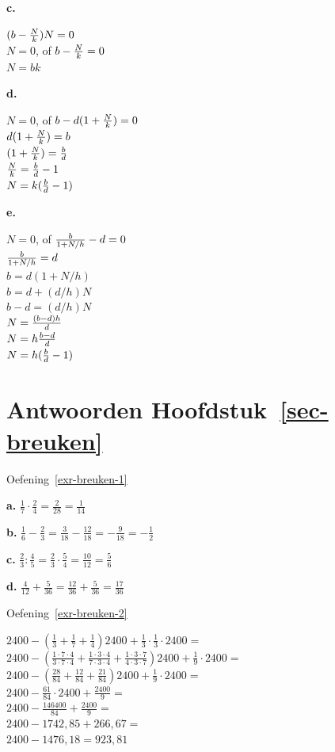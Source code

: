 \documentclass[
  a4paper,
]{scrbook}
\theoremstyle{definition}
\theoremstyle{remark}
\begin{document}
\textbf{c.}

\((b-{N \over k})N=0\)\\
\(N=0\), of \(b - {N \over k} =0\)\\
\(N=bk\)

\textbf{d.}

\(N=0\), of \(b-d(1+{N \over k})=0\)\\
\(d(1+{N \over k})=b\)\\
\((1+{N \over k})={b\over d}\)\\
\({N \over k}={b \over d}-1\)\\
\(N=k({b\over d} -1)\)

\textbf{e.}

\(N=0\), of \({b \over 1+N/h}-d=0\)\\
\({b \over 1+N/h}=d\)\\
\(b=d(1+N/h)\)\\
\(b=d+(d/h)N\)\\
\(b-d=(d/h)N\)\\
\(N={(b-d)h \over d}\)\\
\(N=h{b-d \over d}\)\\
\(N=h({b \over d}-1)\)

\hypertarget{antwoorden-sec-breuken}{%
\section*{\texorpdfstring{Antwoorden
Hoofdstuk~\ref{sec-breuken}}{Antwoorden Hoofdstuk~}}\label{antwoorden-sec-breuken}}


Oefening~\ref{exr-breuken-1}

\textbf{a.}
\(\frac{1}{7}\cdot\frac{2}{4} = \frac{2}{28} = \frac{1}{14}\)

\textbf{b.}
\(\frac{1}{6}-\frac{2}{3}=\frac{3}{18}-\frac{12}{18}=-\frac{9}{18}=-\frac{1}{2}\)

\textbf{c.}
\(\frac{2}{3}:\frac{4}{5}=\frac{2}{3}\cdot\frac{5}{4}=\frac{10}{12}=\frac{5}{6}\)

\textbf{d.}
\(\frac{4}{12}+\frac{5}{36}=\frac{12}{36}+\frac{5}{36}=\frac{17}{36}\)

Oefening~\ref{exr-breuken-2}

\(2400-(\frac{1}{3}+\frac{1}{7}+\frac{1}{4})2400+\frac{1}{3}\cdot\frac{1}{3}\cdot2400=\)\\
\(2400-(\frac{1\cdot7\cdot4}{3\cdot7\cdot4}+\frac{1\cdot3\cdot4}{7\cdot3\cdot4}+\frac{1\cdot3\cdot7}{4\cdot3\cdot7})2400+\frac{1}{9}\cdot2400=\)\\
\(2400-(\frac{28}{84}+\frac{12}{84}+\frac{21}{84})2400+\frac{1}{9}\cdot2400=\)\\
\(2400-\frac{61}{84}\cdot2400+\frac{2400}{9}=\)\\
\(2400-\frac{146400}{84}+\frac{2400}{9}=\)\\
\(2400-1742,85+266,67=\)\\
\(2400-1476,18=923,81\)
\end{document}
